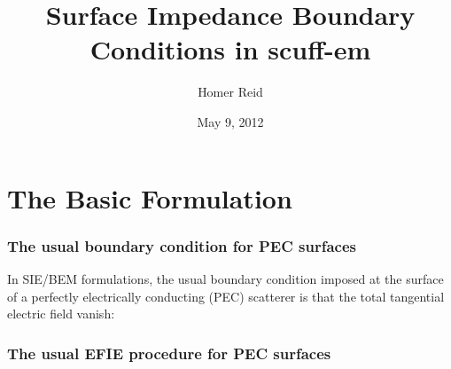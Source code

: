\documentclass{article}
\title{Surface Impedance Boundary Conditions in {\sc scuff-em}}
\author {Homer Reid}
\date {May 9, 2012}
\begin{document}
\maketitle

\pagestyle{myheadings}

\tableofcontents 

\newpage
\section{The Basic Formulation}

\subsubsection*{The usual boundary condition for PEC surfaces}

In SIE/BEM formulations, the usual boundary condition imposed at the 
surface of a perfectly electrically conducting (PEC) scatterer is that 
the total tangential electric field vanish:

\subsubsection*{The usual EFIE procedure for PEC surfaces}
 
\end{document}
